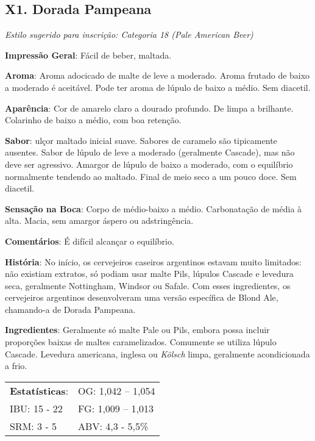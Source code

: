 \subsection*{X1. Dorada Pampeana}

\textit{Estilo sugerido para inscrição: Categoria 18 (Pale American Beer)}

\textbf{Impressão Geral}: Fácil de beber, maltada.

\textbf{Aroma}: Aroma adocicado de malte de leve a moderado. Aroma frutado de baixo a moderado é aceitável. Pode ter aroma de lúpulo de baixo a médio. Sem diacetil.

\textbf{Aparência}: Cor de amarelo claro a dourado profundo. De limpa a brilhante. Colarinho de baixo a médio, com boa retenção.

\textbf{Sabor}: ulçor maltado inicial suave. Sabores de caramelo são tipicamente ausentes. Sabor de lúpulo de leve a moderado (geralmente Cascade), mas não deve ser agressivo. Amargor de lúpulo de baixo a moderado, com o equilíbrio normalmente tendendo ao maltado. Final de meio seco a um pouco doce. Sem diacetil.

\textbf{Sensação na Boca}: Corpo de médio-baixo a médio. Carbonatação de média à alta. Macia, sem amargor áspero ou adstringência.

\textbf{Comentários}: É difícil alcançar o equilíbrio.

\textbf{História}: No início, os cervejeiros caseiros argentinos estavam muito limitados: não existiam extratos, só podiam usar malte Pils, lúpulos Cascade e levedura seca, geralmente Nottingham, Windsor ou Safale. Com esses ingredientes, os cervejeiros argentinos desenvolveram uma versão específica de Blond Ale, chamando-a de Dorada Pampeana.

\textbf{Ingredientes}: Geralmente só malte Pale ou Pils, embora possa incluir proporções baixas de maltes caramelizados. Comumente se utiliza lúpulo Cascade. Levedura americana, inglesa ou \textit{Kölsch} limpa, geralmente acondicionada a frio.

\begin{tabular}{@{}p{35mm}p{35mm}@{}}
  \textbf{Estatísticas}: & OG: 1,042 – 1,054 \\
  IBU: 15 - 22 & FG: 1,009 – 1,013 \\
  SRM: 3 - 5 & ABV: 4,3 - 5,5\%
\end{tabular}